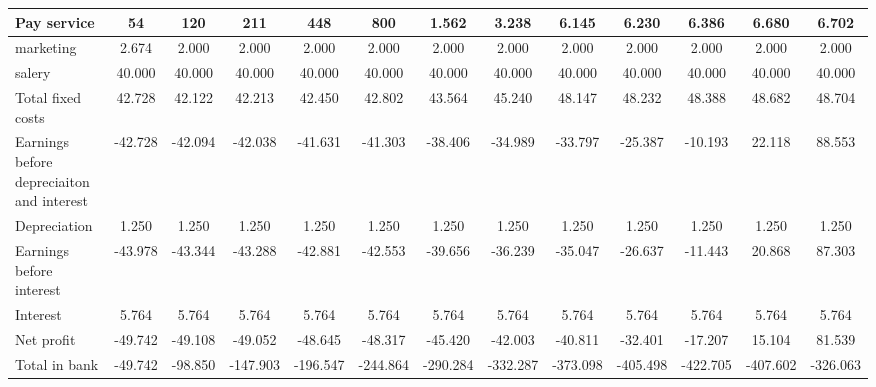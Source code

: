 \begin{tabularx}{\textwidth}{|X|c|c|c|c|c|c|c|c|c|c|c|c|}
\rowcolor[HTML]{C0C0C0} 
Pay service & 54 & 120 & 211 & 448 & 800 & 1.562 & 3.238 & 6.145 & 6.230 & 6.386 & 6.680 & \multicolumn{1}{c|}{\cellcolor[HTML]{C0C0C0}6.702} \\ \hline
marketing & 2.674 & 2.000 & 2.000 & 2.000 & 2.000 & 2.000 & 2.000 & 2.000 & 2.000 & 2.000 & 2.000 & \multicolumn{1}{c|}{2.000} \\ \hline
\rowcolor[HTML]{C0C0C0} 
salery & 40.000 & 40.000 & 40.000 & 40.000 & 40.000 & 40.000 & 40.000 & 40.000 & 40.000 & 40.000 & 40.000 & \multicolumn{1}{c|}{\cellcolor[HTML]{C0C0C0}40.000} \\ \hline \hline
Total fixed costs & 42.728 & 42.122 & 42.213 & 42.450 & 42.802 & 43.564 & 45.240 & 48.147 & 48.232 & 48.388 & 48.682 & \multicolumn{1}{c|}{48.704} \\ \hline \hline
\rowcolor[HTML]{C0C0C0} 
Earnings before depreciaiton and interest & -42.728 & -42.094 & -42.038 & -41.631 & -41.303 & -38.406 & -34.989 & -33.797 & -25.387 & -10.193 & 22.118 & \multicolumn{1}{c|}{\cellcolor[HTML]{C0C0C0}88.553} \\ \hline \hline
Depreciation & 1.250 & 1.250 & 1.250 & 1.250 & 1.250 & 1.250 & 1.250 & 1.250 & 1.250 & 1.250 & 1.250 & \multicolumn{1}{c|}{1.250} \\ \hline
\rowcolor[HTML]{C0C0C0} 
Earnings before interest & -43.978 & -43.344 & -43.288 & -42.881 & -42.553 & -39.656 & -36.239 & -35.047 & -26.637 & -11.443 & 20.868 & \multicolumn{1}{c|}{\cellcolor[HTML]{C0C0C0}87.303} \\ \hline
Interest & 5.764 & 5.764 & 5.764 & 5.764 & 5.764 & 5.764 & 5.764 & 5.764 & 5.764 & 5.764 & 5.764 & \multicolumn{1}{c|}{5.764} \\ \hline \hline
\rowcolor[HTML]{C0C0C0} 
Net profit & -49.742 & -49.108 & -49.052 & -48.645 & -48.317 & -45.420 & -42.003 & -40.811 & -32.401 & -17.207 & 15.104 & \multicolumn{1}{c|}{\cellcolor[HTML]{C0C0C0}81.539} \\ \hline
Total in bank & -49.742 & -98.850 & -147.903 & -196.547 & -244.864 & -290.284 & -332.287 & -373.098 & -405.498 & -422.705 & -407.602 & \multicolumn{1}{c|}{-326.063} \\ \hline
\end{tabularx}
